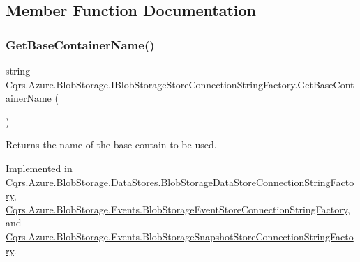 \subsection{Member Function Documentation}
\mbox{\label{interfaceCqrs_1_1Azure_1_1BlobStorage_1_1IBlobStorageStoreConnectionStringFactory_a57145e68e3bda84bc610fa61226a850c_a57145e68e3bda84bc610fa61226a850c}} 
\subsubsection{\texorpdfstring{Get\+Base\+Container\+Name()}{GetBaseContainerName()}}
{\footnotesize\ttfamily string Cqrs.\+Azure.\+Blob\+Storage.\+I\+Blob\+Storage\+Store\+Connection\+String\+Factory.\+Get\+Base\+Container\+Name (\begin{DoxyParamCaption}{ }\end{DoxyParamCaption})}



Returns the name of the base contain to be used. 



Implemented in \hyperlink{classCqrs_1_1Azure_1_1BlobStorage_1_1DataStores_1_1BlobStorageDataStoreConnectionStringFactory_af9d95c58f5f275d9c9c1575b3d147bdb_af9d95c58f5f275d9c9c1575b3d147bdb}{Cqrs.\+Azure.\+Blob\+Storage.\+Data\+Stores.\+Blob\+Storage\+Data\+Store\+Connection\+String\+Factory}, \hyperlink{classCqrs_1_1Azure_1_1BlobStorage_1_1Events_1_1BlobStorageEventStoreConnectionStringFactory_a0e6aadced9c9a583884899a4c9de2f1a_a0e6aadced9c9a583884899a4c9de2f1a}{Cqrs.\+Azure.\+Blob\+Storage.\+Events.\+Blob\+Storage\+Event\+Store\+Connection\+String\+Factory}, and \hyperlink{classCqrs_1_1Azure_1_1BlobStorage_1_1Events_1_1BlobStorageSnapshotStoreConnectionStringFactory_a0b73f62d5148d477fe76d78f4171dac6_a0b73f62d5148d477fe76d78f4171dac6}{Cqrs.\+Azure.\+Blob\+Storage.\+Events.\+Blob\+Storage\+Snapshot\+Store\+Connection\+String\+Factory}.

